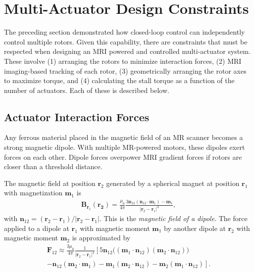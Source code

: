 \section{Multi-Actuator Design Constraints}
\label{sec:analysis}
The preceding section demonstrated how closed-loop control can independently control multiple rotors.  Given this capability, there are constraints that must be respected when designing an MRI powered and controlled multi-actuator system.  These involve (1) arranging the rotors to minimize interaction forces, (2) MRI imaging-based tracking of each rotor, (3) geometrically arranging the rotor axes to maximize torque, and (4) calculating the stall torque as a function of the number of actuators. Each of these is described below.



\subsection{Actuator Interaction Forces}\label{subsec:minimumseparation}
Any ferrous material placed in the magnetic field of an MR scanner becomes a strong magnetic dipole.  With multiple MR-powered motors, these dipoles exert forces on each other.  Dipole forces overpower MRI gradient forces if rotors are closer than a threshold distance.

The magnetic field at position $\mathbf{r}_2$ generated by a spherical magnet at position $\mathbf{r}_1$ with magnetization  $\mathbf{m}_1$ is  \cite{Schill2003} %
\begin{align}
\label{eq:dipoleMagField}
 \mathbf{B}_{\mathbf{r}_1}(\mathbf{r_2}) = \frac{\mu_0}{4 \pi}\frac{3 \mathbf{n}_{12}(\mathbf{n}_{12} \cdot \mathbf{m}_1) - \mathbf{m}_1}
 {|\mathbf{r}_2-\mathbf{r}_1|^3},
\end{align}
with  $\mathbf{n}_{12} = (\mathbf{r}_2-\mathbf{r}_1)/|\mathbf{r}_2-\mathbf{r}_1|$. This is the \emph{magnetic field of a dipole}.
 The force applied to a dipole at $\mathbf{r}_1$ with magnetic moment $\mathbf{m}_1$ by another dipole at $\mathbf{r}_2$ with magnetic moment $\mathbf{m}_2$ is approximated by
\begin{align}
\mathbf{F}_{12} \approx \frac{3\mu_0}{4 \pi} \frac{1}{|\mathbf{r}_2 - \mathbf{r}_1 |^4}
\left[5 \mathbf{n}_{12}\Big(\left(\mathbf{m}_1 \cdot \mathbf{n}_{12} \right)   \left(\mathbf{m}_2 \cdot \mathbf{n}_{12} \right) \Big) \right. \nonumber \\
\left.
-  \mathbf{n}_{12} \left(\mathbf{m}_2 \cdot \mathbf{m}_1 \right)
-  \mathbf{m}_{1} \left(\mathbf{m}_2 \cdot \mathbf{n}_{12} \right)  -  \mathbf{m}_{2} \left(\mathbf{m}_1 \cdot \mathbf{n}_{12}\right)   \right].\nonumber
\label{eq:dipoleForce}
\end{align}

